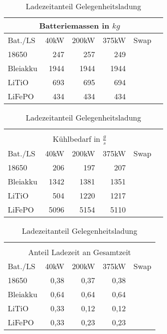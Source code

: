 \begin{table}[h!]
	\begin{minipage}{0.45\textwidth}
		\centering
		\begin{tabular}{lrrrrr}
			\multicolumn{5}{c}{Batteriemassen in $kg$} \\ \toprule
			Bat./LS     & 40kW & 200kW &         375kW & Swap\\ \midrule
			18650 &  247 &   257 &           249 & \\
			Bleiakku    & 1944 &  1944 &          1944 & \\
			LiTiO       &  693 &   695 &           694 & \\
			LiFePO      &  434 &   434 &           434 & \\ \bottomrule 
		\end{tabular} 
		\caption{Batteriemassen Gelegnheitsladung}
		
		\begin{tabular}{lrrrrr}
			 & & & & \\
			\multicolumn{5}{c}{Kühlbedarf in $\frac{g}{s}$} \\ \toprule
			Bat./LS     & 40kW & 200kW &              375kW & Swap\\ \midrule
			18650 &  206 &   197 &                207 & \\
			Bleiakku    & 1342 &  1381 &               1351 & \\
			LiTiO       &  504 &  1220 &               1217 & \\
			LiFePO      & 5096 &  5154 &               5110 & \\ \bottomrule 
		\end{tabular} 
		\caption{Kühlungsbedarf Gelegenheitsladung}
		
		\begin{tabular}{lrrrr}
			 & & & & \\
			\multicolumn{5}{c}{Anteil Ladezeit an Gesamtzeit} \\ \toprule
			Bat./LS     & 40kW & 200kW &                375kW & Swap\\ \midrule
			18650 & 0,38 &  0,37 &                 0,38 & \\
			Bleiakku    & 0,64 &  0,64 &                 0,64 & \\
			LiTiO       & 0,33 &  0,12 &                 0,12 & \\
			LiFePO      & 0,33 &  0,23 &                 0,23 & \\ \bottomrule 
		\end{tabular} 
		\caption{Ladezeitanteil Gelegenheitsladung}
		

\end{minipage}
\end{table}
